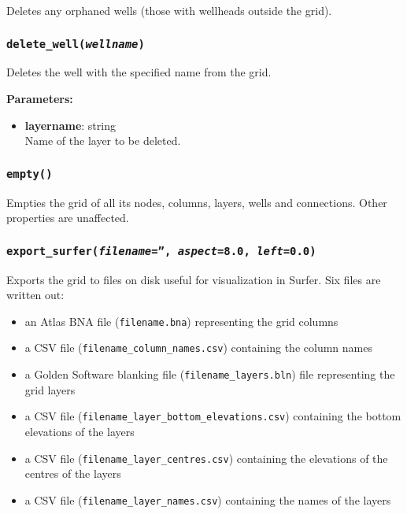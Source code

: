 Deletes any orphaned wells (those with wellheads outside the grid).

\begin{snugshade}\subsubsection{\texttt{delete\_well(\emph{wellname})}}\end{snugshade}
\label{sec:mulgrid:delete_well}

Deletes the well with the specified name from the grid.

\textbf{Parameters:}
\begin{itemize}
\item \textbf{layername}: string\\
  Name of the layer to be deleted.
\end{itemize}

\begin{snugshade}\subsubsection{\texttt{empty()}}\end{snugshade}
\label{sec:mulgrid:empty}

Empties the grid of all its nodes, columns, layers, wells and connections.  Other properties are unaffected.

\begin{snugshade}\subsubsection{\texttt{export\_surfer(\emph{filename}='', \emph{aspect}=8.0, \emph{left}=0.0)}}\end{snugshade}
\label{sec:mulgrid:export_surfer}

Exports the grid to files on disk useful for visualization in Surfer.  Six files are written out:

\begin{itemize}
\item an Atlas BNA file (\texttt{filename.bna}) representing the grid columns
\item a CSV file (\texttt{filename\_column\_names.csv}) containing the column names
\item a Golden Software blanking file (\texttt{filename\_layers.bln}) file representing the grid layers
\item a CSV file (\texttt{filename\_layer\_bottom\_elevations.csv}) containing the bottom elevations of the layers
\item a CSV file (\texttt{filename\_layer\_centres.csv}) containing the elevations of the centres of the layers
\item a CSV file (\texttt{filename\_layer\_names.csv}) containing the names of the layers
\end{itemize}


